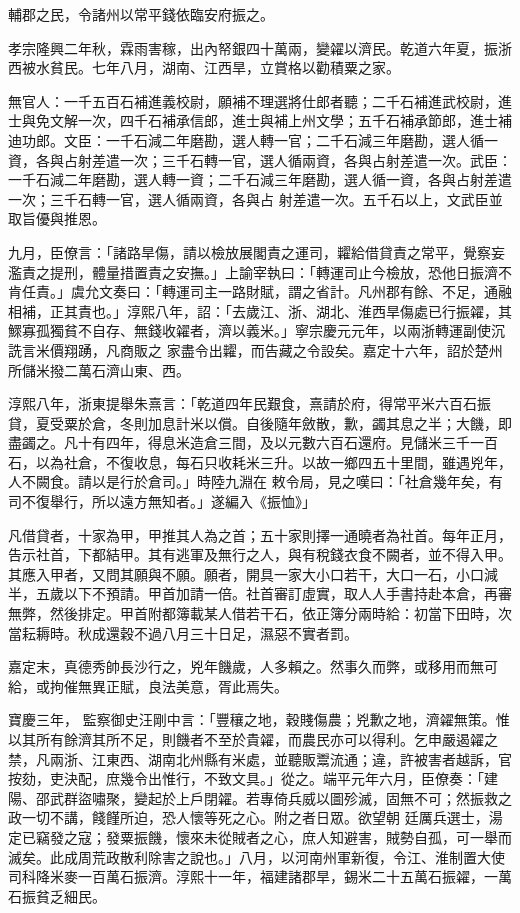 \begin{pinyinscope}
 輔郡之民，令諸州以常平錢依臨安府振之。



 孝宗隆興二年秋，霖雨害稼，出內帑銀四十萬兩，變糴以濟民。乾道六年夏，振浙西被水貧民。七年八月，湖南、江西旱，立賞格以勸積粟之家。



 無官人：一千五百石補進義校尉，願補不理選將仕郎者聽；二千石補進武校尉，進士與免文解一次，四千石補承信郎，進士與補上州文學；五千石補承節郎，進士補迪功郎。文臣：一千石減二年磨勘，選人轉一官；二千石減三年磨勘，選人循一資，各與占射差遣一次；三千石轉一官，選人循兩資，各與占射差遣一次。武臣：一千石減二年磨勘，選人轉一資；二千石減三年磨勘，選人循一資，各與占射差遣一次；三千石轉一官，選人循兩資，各與占
 射差遣一次。五千石以上，文武臣並取旨優與推恩。



 九月，臣僚言：「諸路旱傷，請以檢放展閣責之運司，糶給借貸責之常平，覺察妄濫責之提刑，體量措置責之安撫。」上諭宰執曰：「轉運司止今檢放，恐他日振濟不肯任責。」虞允文奏曰：「轉運司主一路財賦，謂之省計。凡州郡有餘、不足，通融相補，正其責也。」淳熙八年，詔：「去歲江、浙、湖北、淮西旱傷處已行振糴，其鰥寡孤獨貧不自存、無錢收糴者，濟以義米。」寧宗慶元元年，以兩浙轉運副使沉詵言米價翔踴，凡商販之
 家盡令出糶，而告藏之令設矣。嘉定十六年，詔於楚州所儲米撥二萬石濟山東、西。



 淳熙八年，浙東提舉朱熹言：「乾道四年民艱食，熹請於府，得常平米六百石振貸，夏受粟於倉，冬則加息計米以償。自後隨年斂散，歉，蠲其息之半；大饑，即盡蠲之。凡十有四年，得息米造倉三間，及以元數六百石還府。見儲米三千一百石，以為社倉，不復收息，每石只收耗米三升。以故一鄉四五十里間，雖遇兇年，人不闕食。請以是行於倉司。」時陸九淵在
 敕令局，見之嘆曰：「社倉幾年矣，有司不復舉行，所以遠方無知者。」遂編入《振恤》」



 凡借貸者，十家為甲，甲推其人為之首；五十家則擇一通曉者為社首。每年正月，告示社首，下都結甲。其有逃軍及無行之人，與有稅錢衣食不闕者，並不得入甲。其應入甲者，又問其願與不願。願者，開具一家大小口若干，大口一石，小口減半，五歲以下不預請。甲首加請一倍。社首審訂虛實，取人人手書持赴本倉，再審無弊，然後排定。甲首附都簿載某人借若干石，依正簿分兩時給：初當下田時，次當耘耨時。秋成還穀不過八月三十日足，濕惡不實者罰。



 嘉定末，真德秀帥長沙行之，兇年饑歲，人多賴之。然事久而弊，或移用而無可給，或拘催無異正賦，良法美意，胥此焉失。



 寶慶三年，
 監察御史汪剛中言：「豐穰之地，穀賤傷農；兇歉之地，濟糴無策。惟以其所有餘濟其所不足，則饑者不至於貴糴，而農民亦可以得利。乞申嚴遏糴之禁，凡兩浙、江東西、湖南北州縣有米處，並聽販鬻流通；違，許被害者越訴，官按劾，吏決配，庶幾令出惟行，不致文具。」從之。端平元年六月，臣僚奏：「建陽、邵武群盜嘯聚，變起於上戶閉糴。若專倚兵威以圖殄滅，固無不可；然振救之政一切不講，餞饉所迫，恐人懷等死之心。附之者日眾。欲望朝
 廷厲兵選士，湯定已竊發之寇；發粟振饑，懷來未從賊者之心，庶人知避害，賊勢自孤，可一舉而滅矣。此成周荒政散利除害之說也。」八月，以河南州軍新復，令江、淮制置大使司科降米麥一百萬石振濟。淳熙十一年，福建諸郡旱，錫米二十五萬石振糴，一萬石振貧乏細民。




\end{pinyinscope}
